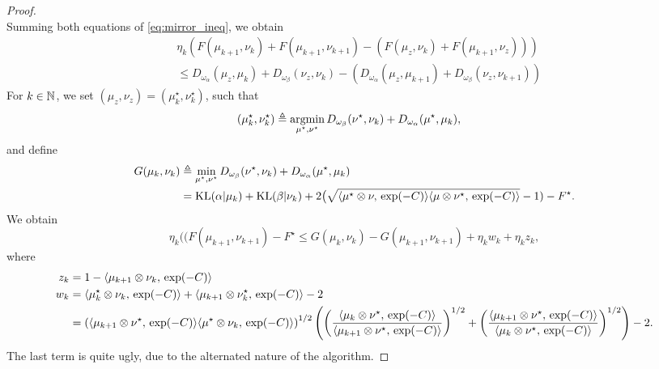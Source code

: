 \documentclass[a4paper, 10pt]{article}
\begin{document}
\begin{proof}
\begin{equation}
\end{equation}
Summing both equations of \eqref{eq:mirror_ineq}, we obtain
\begin{align}
    &\eta_k (F(\mu_{k+1},\nu_k) + F(\mu_{k+1},\nu_{k+1})
    - (F(\mu_z, \nu_k) + F(\mu_{k+1}, \nu_z))) \\ 
    &\leq 
    D_{\omega_\alpha}(\mu_z, \mu_k)
    + D_{\omega_\beta}(\nu_z, \nu_k)
    - (D_{\omega_\alpha}(\mu_z, \mu_{k+1}) 
     + D_{\omega_\beta}(\nu_z, \nu_{k+1}))
\end{align}
For $k \in \mathbb{N}$, we set $(\mu_z, \nu_z) = (\mu^\star_k, \nu^\star_k)$, such that
\begin{align}
    (\mu^\star_k, \nu^\star_k) &\triangleq \operatorname*{argmin}_{\mu^\star, \nu^\star} D_{\omega_\beta}
    (\nu^\star, \nu_k) + D_{\omega_\alpha}(\mu^\star, \mu_k),
\end{align}
and define
\begin{align}
    G(\mu_k, \nu_k) &\triangleq \min_{\mu^\star, \nu^\star} 
    D_{\omega_\beta}
    (\nu^\star, \nu_k) + D_{\omega_\alpha}(\mu^\star, \mu_k) \\
    &= \text{KL}(\alpha|\mu_k) + \text{KL}(\beta|\nu_k) 
    + 2 \big( \sqrt{\langle \mu^\star \otimes \nu,\,\exp(-C)\rangle 
    \langle \mu \otimes \nu^\star,\,\exp(-C)\rangle} - 1) - F^\star. \\
\end{align}
We obtain
\begin{equation}
    \eta_k (
        (F(\mu_{k+1}, \nu_{k+1}) - F^\star
        \leq G(\mu_k, \nu_{k}) - G(\mu_{k+1}, \nu_{k+1}) + \eta_k w_k + \eta_k z_k,
\end{equation}
where
\begin{align}
    z_k &= 1 - \langle \mu_{k+1} \otimes \nu_k,\,\exp(-C)\rangle \\
    w_k &= \langle \mu_k^\star \otimes \nu_k,\,\exp(-C)\rangle
    + \langle \mu_{k+1} \otimes \nu_k^\star,\,\exp(-C)\rangle - 2\\
    &=\left(
    \langle \mu_{k+1} \otimes \nu^\star,\,\exp(-C)\rangle
    \langle \mu^\star \otimes \nu_k,\,\exp(-C)\rangle
    \right)^{1/2}
    \left(
        \left(\frac{
            \langle \mu_k \otimes \nu^\star,\,\exp(-C)\rangle
        }
        {
            \langle \mu_{k+1} \otimes \nu^\star,\,\exp(-C)\rangle
        }\right)^{1/2}
        + 
        \left(\frac{
            \langle \mu_{k+1} \otimes \nu^\star,\,\exp(-C)\rangle
        }
        {
            \langle \mu_k \otimes \nu^\star,\,\exp(-C)\rangle
        }
        \right)^{1/2}
    \right) - 2.
\end{align}
The last term is quite ugly, due to the alternated nature of the algorithm.


\end{proof}
\end{document}
